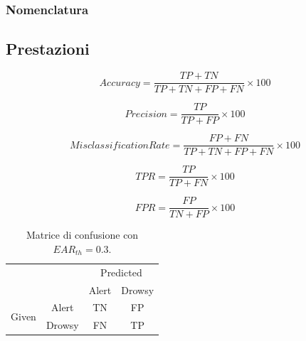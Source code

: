 \documentclass[12pt]{article}
\begin{document}
\subsubsection{Nomenclatura}

\subsection{Prestazioni}

\begin{equation}
Accuracy = \frac{TP + TN}{TP + TN + FP + FN} \times 100
\end{equation}

\begin{equation}
Precision = \frac{TP}{TP + FP} \times 100
\end{equation}

\begin{equation}
MisclassificationRate = \frac{FP + FN}{TP + TN + FP + FN} \times 100
\end{equation}

\begin{equation}
TPR = \frac{TP}{TP + FN} \times 100
\end{equation}

\begin{equation}
FPR = \frac{FP}{TN + FP} \times 100
\end{equation}

\begin{table}[h]
	\centering
	\begin{tabular}{cc|c|c|}
		\cline{3-4}
		&        & \multicolumn{2}{c|}{Predicted} \\ \cline{3-4} 
		&        & Alert         & Drowsy         \\ \hline
		\multicolumn{1}{|c|}{\multirow{2}{*}{Given}} & Alert  & TN & FP\\ \cline{2-4} 
		\multicolumn{1}{|c|}{}                       & Drowsy & FN & TP\\ \hline
	\end{tabular}
	\caption{Matrice di confusione con $EAR_{th}=0.3$.}
	\label{table:cm_0_3}
\end{table}

\end{document}
